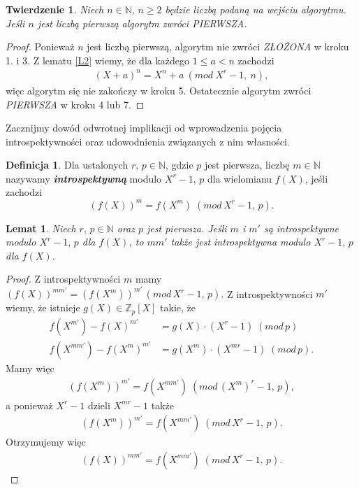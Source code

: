 \documentclass[polish,declaration,shortabstract]{iithesis}
\theoremstyle{definition}
\newtheorem{definition}{Definicja}
\theoremstyle{remark} \newtheorem{observation}{Obserwacja}
\theoremstyle{plain} \newtheorem{theorem}{Twierdzenie}
\theoremstyle{plain} \newtheorem{lemma}{Lemat}
\theoremstyle{remark} \newtheorem*{remark*}{Uwaga}
\theoremstyle{reminder} \newtheorem*{reminder*}{Przypomnienie}
\begin{document}
\begin{theorem}
	Niech $n \in \mathbb{N}, \, n \geq 2$ będzie liczbą podaną na wejściu algorytmu. Jeśli $n$ jest liczbą pierwszą algorytm zwróci \textit{PIERWSZA}.
\end{theorem}
	
\begin{proof}
	Ponieważ $n$ jest liczbą pierwszą, algorytm nie zwróci \textit{ZŁOŻONA} w kroku 1. i 3. Z lematu \ref{L2} wiemy, że dla każdego $1 \leq a < n$ zachodzi 
	\begin{align*}
		(X + a)^n = X^n + a \: (mod \: X^r - 1, \: n), 
	\end{align*}
	więc algorytm się nie zakończy w kroku 5. Ostatecznie algorytm zwróci \textit{PIERWSZA} w kroku 4 lub 7.
\end{proof}

Zacznijmy dowód odwrotnej implikacji od wprowadzenia pojęcia introspektywności oraz udowodnienia związanych z nim własności. 

\begin{definition}
	Dla ustalonych $r, \, p \in \mathbb{N}$, gdzie $p$ jest pierwsza, liczbę $m \in \mathbb{N}$ nazywamy \textbf{\textit{introspektywną}} modulo $X^r - 1, \, p$ dla wielomianu $f(X)$, jeśli zachodzi \[(f(X))^m = f(X^m) \; (mod \, X^r - 1, \, p).\]
\end{definition}
	
\begin{lemma}\label{intro1}
	Niech $r, \, p \in \mathbb{N}$ oraz $p$ jest pierwsza. Jeśli $m$ i $m'$ są introspektywne modulo $X^r - 1, \, p$ dla $f(X)$, to $mm'$ także jest introspektywna modulo $X^r - 1, \, p$ dla $f(X)$.
\end{lemma}
	
\begin{proof}
	Z introspektywności $m$ mamy $(f(X))^{mm'} = (f(X^m))^{m'} \, (mod \, X^r - 1, \, p).$ Z introspektywności $m'$ wiemy, że istnieje $g(X) \in \mathbb{Z}_p[X]$ takie, że 
	\begin{align*}
		f(X^{m'}) - {f(X)}^{m'}    & = g(X) \cdot (X^r - 1)     \; (mod \, p)   \\
		f(X^{mm'}) - {f(X^m)}^{m'} & = g(X^m) \cdot (X^{mr} - 1) \; (mod \, p). 
	\end{align*}
	Mamy więc 
	\begin{align*}
		(f(X^m))^{m'} = f(X^{mm'}) \; (mod \, (X^m)^r - 1, \, p), 
	\end{align*}
	a ponieważ $X^r - 1$ dzieli $X^{mr} - 1$ także 
	\begin{align*}
		(f(X^m))^{m'} = f(X^{mm'}) \; (mod \, X^r - 1, \, p). 
	\end{align*}
	Otrzymujemy więc 
	\begin{align*}
		(f(X))^{mm'} = f(X^{mm'}) \; (mod \, X^r - 1, \, p). 
	\end{align*}
\end{proof}
	
\end{document}
